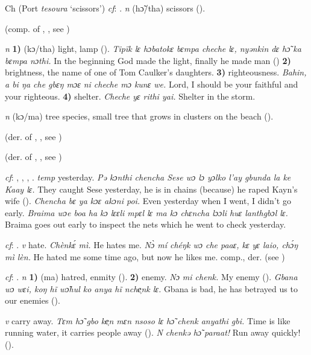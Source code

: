 \begin{letter}{Ch}
 (Port \textit{tesoura} ‘scissors') \textit{cf}: . \textit{n} (hɔ̃/tha) scissors (\citealt{Pichl1967}). 

 (comp. of , , see ) 

 \textit{n} \textbf{1)} (kɔ/tha) light, lamp (\citealt{Pichl1967}). \textit{Tipïk lɛ hɔbatokɛ bɛmpa cheche lɛ, nyənkin dɛ hɔ̃ ka bɛmpa nɔthi.} In the beginning God made the light, finally he made man (\citealt{Pichl1967}) \textbf{2)} brightness, the name of one of Tom Caulker's daughters. \textbf{3)} righteousness. \textit{Bahin, a bi ŋa che gbɛŋ mɔɛ ni cheche mɔ kunɛ we.} Lord, I should be your faithful and your righteous. \textbf{4)} shelter. \textit{Cheche yɛ rithi yai.} Shelter in the storm.

 \textit{n} (kɔ/ma) tree species, small tree that grows in clusters on the beach (\citealt{Pichl1967}). 

 (der. of , , see ) 

 (der. of , , see ) 

 \textit{cf}: , , , . \textit{temp} yesterday. \textit{Pə kɔnthi chencha Sese wɔ lɔ yɔlko l'ay gbunda la ke Kaay lɛ.} They caught Sese yesterday, he is in chains (because) he raped Kayn's wife (\citealt{Pichl1967}). \textit{Chencha bɛ ya kɔɛ akɔni poi.} Even yesterday when I went, I didn't go early. \textit{Braima wɔe boa ha kɔ lɛɛli mpɛl lɛ ma kɔ chɛncha lɔɔli huɛ lanthgbɔl lɛ.} Braima goes out early to inspect the nets which he went to check yesterday.

 \textit{cf}: . \textit{v} hate. \textit{Chènkɛ́ mì.} He hates me. \textit{Nɔ̀ mí chéŋk wɔ che paaɛ, kɛ yɛ laio, chɔ́ŋ mì lèn.} He hated me some time ago, but now he likes me. comp., der.  (see )

 \textit{cf}: . \textit{n} \textbf{1)} (ma) hatred, enmity (\citealt{Pichl1967}). \textbf{2)} enemy. \textit{Nɔ mi chenk.} My enemy (\citealt{Pichl1967}). \textit{Gbana wɔ wɛi, koŋ hĩ wɔ̃hul ko anya hĩ nche̹nk lɛ.} Gbana is bad, he has betrayed us to our enemies (\citealt{Pichl1967}). 

 \textit{v} carry away. \textit{Tɛm hɔ̃ gbo ke̹n mɛn nsoso lɛ hɔ̃ chenk anyathi gbi.} Time is like running water, it carries people away (\citealt{Pichl1967}). \textit{N chenkə hɔ̃ paraat!} Run away quickly! (\citealt{Pichl1967}). 


\end{letter}
